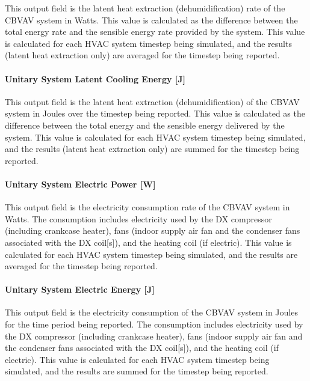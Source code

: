 This output field is the latent heat extraction (dehumidification) rate of the CBVAV system in Watts. This value is calculated as the difference between the total energy rate and the sensible energy rate provided by the system. This value is calculated for each HVAC system timestep being simulated, and the results (latent heat extraction only) are averaged for the timestep being reported.

\paragraph{Unitary System Latent Cooling Energy {[}J{]}}\label{unitary-system-latent-cooling-energy-j}

This output field is the latent heat extraction (dehumidification) of the CBVAV system in Joules over the timestep being reported. This value is calculated as the difference between the total energy and the sensible energy delivered by the system. This value is calculated for each HVAC system timestep being simulated, and the results (latent heat extraction only) are summed for the timestep being reported.

\paragraph{Unitary System Electric Power {[}W{]}}\label{unitary-system-electric-power-w-2}

This output field is the electricity consumption rate of the CBVAV system in Watts. The consumption includes electricity used by the DX compressor (including crankcase heater), fans (indoor supply air fan and the condenser fans associated with the DX coil{[}s{]}), and the heating coil (if electric). This value is calculated for each HVAC system timestep being simulated, and the results are averaged for the timestep being reported.

\paragraph{Unitary System Electric Energy {[}J{]}}\label{unitary-system-electric-energy-j-2}

This output field is the electricity consumption of the CBVAV system in Joules for the time period being reported. The consumption includes electricity used by the DX compressor (including crankcase heater), fans (indoor supply air fan and the condenser fans associated with the DX coil{[}s{]}), and the heating coil (if electric). This value is calculated for each HVAC system timestep being simulated, and the results are summed for the timestep being reported.

